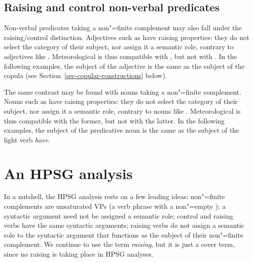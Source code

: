 \subsection{Raising and control non-verbal predicates}\label{nonverbal}

Non-verbal predicates taking a non"=finite complement may also fall under the raising/control distinction.  Adjectives such as  have raising properties: they do not select the category of their subject, nor assign it a semantic role, contrary to adjectives like . Meteorological  is thus compatible with , but not with . In the following examples, the subject of the adjective is the same as the subject of the copula (see Section~\ref{sec-copular-constructions} below).

\eal
{}
\zl

The same contrast may be found with  nouns taking a non"=finite complement. Nouns such as  have raising properties: they do not select the category of their subject, nor assign it a semantic role, contrary to nouns like . Meteorological  is thus compatible with the former, but not with the latter. In the following examples, the subject of the predicative noun is the same as the subject of the light verb \emph{have}.


\eal
{}
\zl

\section{An HPSG analysis}


In a nutshell, the HPSG analysis rests on a few leading ideas: non"=finite complements are
unsaturated VPs (a verb phrase with a non"=empty \subjl); a syntactic argument need not be assigned
a semantic role; control and raising verbs have the same syntactic arguments; raising verbs do not
assign a semantic role to the syntactic argument that functions as the subject of their non"=finite
complement. We continue to use the term \emph{raising}, but it is just a cover term, since no raising
is taking place in HPSG analyses. 

